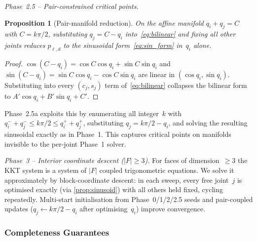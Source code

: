 \documentclass[journal]{IEEEtran}
\newtheorem{proposition}{Proposition}
\begin{document}
\emph{Phase~2.5 -- Pair-constrained critical points.}
\begin{proposition}[Pair-manifold reduction]\label{prop:pair_reduce}
On the affine manifold $q_i + q_j = C$ with $C = k\pi/2$,
substituting $q_j = C - q_i$ into~\eqref{eq:bilinear} and fixing
all other joints reduces $p_{\ell,d}$ to the sinusoidal
form~\eqref{eq:sin_form} in~$q_i$ alone.
\end{proposition}
\begin{proof}
$\cos(C-q_i) = \cos C \cos q_i + \sin C \sin q_i$ and
$\sin(C-q_i) = \sin C \cos q_i - \cos C \sin q_i$ are linear
in $(\cos q_i, \sin q_i)$.
Substituting into every $(c_j, s_j)$ term of~\eqref{eq:bilinear}
collapses the bilinear form to $A'\cos q_i + B'\sin q_i + C'$.
\end{proof}
Phase~2.5a exploits this by enumerating all integer~$k$ with
$q_i^- + q_j^- \leq k\pi/2 \leq q_i^+ + q_j^+$,
substituting $q_j = k\pi/2 - q_i$,
and solving the resulting sinusoidal exactly as in Phase~1.
This captures critical points on manifolds invisible to the
per-joint Phase~1 solver.

\emph{Phase~3 -- Interior coordinate descent ($|F|\geq 3$).}
For faces of dimension~$\geq 3$ the KKT system is a system of
$|F|$ coupled trigonometric equations.
We solve it approximately by block-coordinate descent:
in each sweep, every free joint~$j$ is optimised exactly
(via \cref{prop:sinusoid}) with all others held fixed, cycling
repeatedly.
Multi-start initialisation from Phase~0/1/2/2.5 seeds and
pair-coupled updates ($q_j \leftarrow k\pi/2 - q_i$ after
optimising~$q_i$) improve convergence.


\subsubsection{Completeness Guarantees}\label{sec:completeness}
\end{document}
